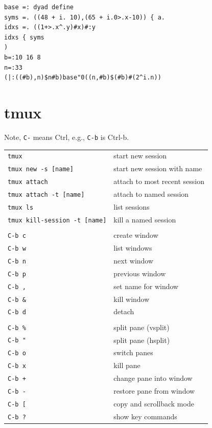 \documentclass[10pt,twoside,openright]{memoir}
\begin{document}
\vskip 0.3in

{\footnotesize
\begin{verbatim}
base =: dyad define
syms =. ((48 + i. 10),(65 + i.0>.x-10)) { a.
idxs =. ((1+>.x^.y)#x)#:y
idxs { syms
)
b=:10 16 8
n=:33
(|:((#b),n)$n#b)base"0((n,#b)$(#b)#(2^i.n))
\end{verbatim}
}


\chapter{tmux}

{\footnotesize

Note, \texttt{C-} means Ctrl, e.g., \texttt{C-b} is Ctrl-b.

\vskip 0.2in

\noindent \begin{tabular}{ll}
\texttt{tmux} & start new session \\
\texttt{tmux new -s [name]} & start new session with name \\
\texttt{tmux attach} & attach to most recent session \\
\texttt{tmux attach -t [name]} & attach to named session \\
\texttt{tmux ls} & list sessions \\
\texttt{tmux kill-session -t [name]} & kill a named session \\
& \\
\texttt{C-b c} & create window \\
\texttt{C-b w} & list windows \\
\texttt{C-b n} & next window \\
\texttt{C-b p} & previous window \\
\texttt{C-b ,} & set name for window \\
\texttt{C-b \&} & kill window \\
\texttt{C-b d} & detach \\
& \\
\texttt{C-b \%} & split pane (vsplit) \\
\texttt{C-b "} & split pane (hsplit) \\
\texttt{C-b o} & switch panes \\
\texttt{C-b x} & kill pane \\
\texttt{C-b +} & change pane into window \\
\texttt{C-b -} & restore pane from window \\
\texttt{C-b [} & copy and scrollback mode \\
\texttt{C-b ?} & show key commands \\
\end{tabular}
}
\end{document}
